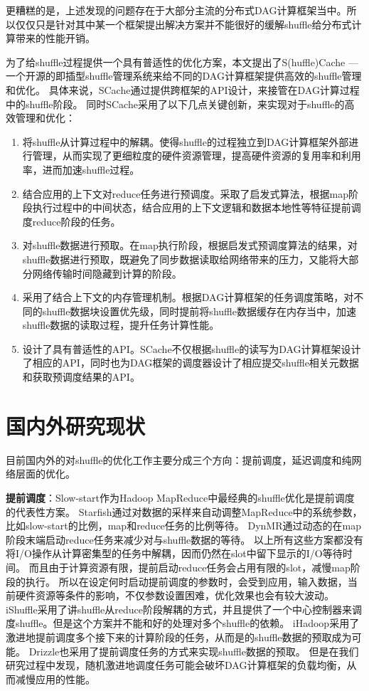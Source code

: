 更糟糕的是，上述发现的问题存在于大部分主流的分布式DAG计算框架当中。所以仅仅只是针对其中某一个框架提出解决方案并不能很好的缓解shuffle给分布式计算带来的性能开销。

为了给shuffle过程提供一个具有普适性的优化方案，本文提出了S(huffle)Cache --- 一个开源的即插型shuffle管理系统来给不同的DAG计算框架提供高效的shuffle管理和优化。
具体来说，SCache通过提供跨框架的API设计，来接管在DAG计算过程中的shuffle阶段。
同时SCache采用了以下几点关键创新，来实现对于shuffle的高效管理和优化：

\begin{enumerate}
	\item 将shuffle从计算过程中的解耦。使得shuffle的过程独立到DAG计算框架外部进行管理，从而实现了更细粒度的硬件资源管理，提高硬件资源的复用率和利用率，进而加速shuffle过程。
	\item 结合应用的上下文对reduce任务进行预调度。采取了启发式算法，根据map阶段执行过程中的中间状态，结合应用的上下文逻辑和数据本地性等特征提前调度reduce阶段的任务。
	\item 对shuffle数据进行预取。在map执行阶段，根据启发式预调度算法的结果，对shuffle数据进行预取，既避免了同步数据读取给网络带来的压力，又能将大部分网络传输时间隐藏到计算的阶段。
	\item 采用了结合上下文的内存管理机制。根据DAG计算框架的任务调度策略，对不同的shuffle数据块设置优先级，同时提前将shuffle数据缓存在内存当中，加速shuffle数据的读取过程，提升任务计算性能。
	\item 设计了具有普适性的API。SCache不仅根据shuffle的读写为DAG计算框架设计了相应的API，同时也为DAG框架的调度器设计了相应提交shuffle相关元数据和获取预调度结果的API。
\end{enumerate}

\section{国内外研究现状}

目前国内外的对shuffle的优化工作主要分成三个方向：提前调度，延迟调度和纯网络层面的优化。

\textbf{提前调度}：Slow-start作为Hadoop MapReduce\cite{hadoop}中最经典的shuffle优化是提前调度的代表性方案。
Starfish\cite{starfish}通过对数据的采样来自动调整MapReduce中的系统参数，比如slow-start的比例，map和reduce任务的比例等待。
DynMR\cite{dynmr}通过动态的在map阶段末端启动reduce任务来减少对与shuffle数据的等待。
以上所有这些方案都没有将I/O操作从计算密集型的任务中解耦，因而仍然在slot中留下显示的I/O等待时间。
而且由于计算资源有限，提前启动reduce任务会占用有限的slot，减慢map阶段的执行。
所以在设定何时启动提前调度的参数时，会受到应用，输入数据，当前硬件资源等条件的影响，不仅参数设置困难，优化效果也会有较大波动。
iShuffle\cite{ishuffle}采用了讲shuffle从reduce阶段解耦的方式，并且提供了一个中心控制器来调度shuffle。但是这个方案并不能和好的处理对多个shuffle的依赖。
iHadoop\cite{ihadoop}采用了激进地提前调度多个接下来的计算阶段的任务，从而是的shuffle数据的预取成为可能。
Drizzle\cite{drizzle}也采用了提前调度任务的方式来实现shuffle数据的预取。
但是在我们研究过程中发现，随机激进地调度任务可能会破坏DAG计算框架的负载均衡，从而减慢应用的性能。

